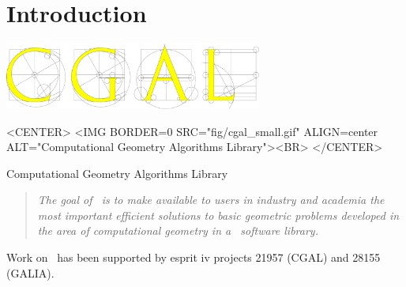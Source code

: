 
\chapter{Introduction}
\label{chap:intro}

\begin{ccTexOnly}
\begin{center}
  \includegraphics[width=240pt]{Developers_manual/fig/cgal}
\end{center}
\end{ccTexOnly}

\begin{ccHtmlOnly}
<CENTER>
<IMG BORDER=0 SRC="fig/cgal_small.gif" 
  ALIGN=center ALT="Computational Geometry Algorithms Library"><BR>
</CENTER>
\end{ccHtmlOnly}
\centerline{{\sc Computational Geometry Algorithms Library}}


\begin{quote}
{\em The goal of \cgal\ is to make available to users in industry and academia
the most important efficient solutions to basic geometric problems
developed in the area of computational geometry in a \CC\ software library.}
\end{quote}

Work on \cgal\ has been supported by {\sc esprit iv} projects 21957 (CGAL) and
28155 (GALIA).


\InternalOnly{

}







